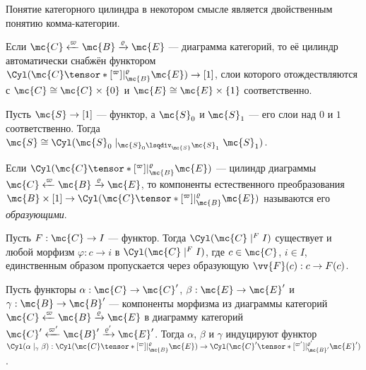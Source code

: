 \documentclass[
	extrafontsizes,
	11pt,
	hyphens,
]{memoir}
\begin{document}
\begin{remark}
Понятие категорного цилиндра в некотором смысле является двойственным понятию комма-категории.
\end{remark}

\begin{observation}
Если \(\mc{C} \xleftarrow{\varpi} \mc{B} \xrightarrow{\varrho} \mc{E}\) --- диаграмма категорий, то её цилиндр автоматически снабжён функтором \(\Cyl(\mc{C} \tensor*[^{\varpi}]{\mid}{^{\varrho}_{\mc{B}}} \mc{E}) \to [1]\), слои которого отождествляются с \(\mc{C} \cong \mc{C} \times \{0\}\) и \(\mc{E} \cong \mc{E} \times \{1\}\) соответственно.
\end{observation}

\begin{observation}
Пусть \(\mc{S} \to [1]\) --- функтор, а \(\mc{S}_0\) и \(\mc{S}_1\) --- его слои над \(0\) и \(1\) соответственно. Тогда
\(\mc{S} \cong \Cyl(\mc{S}_0 \mid_{\mc{S}_0 \lsqdiv_{\mc{S}} \mc{S}_1} \mc{S}_1)\).
\end{observation}

\begin{definition}
Если \(\Cyl(\mc{C} \tensor*[^{\varpi}]{\mid}{^{\varrho}_{\mc{B}}} \mc{E})\) --- цилиндр диаграммы \(\mc{C} \xleftarrow{\varpi} \mc{B} \xrightarrow{\varrho} \mc{E}\),
то компоненты естественного преобразования
\(\mc{B} \times [1] \to \Cyl(\mc{C} \tensor*[^{\varpi}]{\mid}{^{\varrho}_{\mc{B}}} \mc{E})\)
называются его \emph{образующими}.
\end{definition}

\begin{observation}
Пусть \(F : \mc{C} \to I\) --- функтор.
Тогда \(\Cyl(\mc{C} \mid^F I)\) существует и любой морфизм \(\varphi : c \to i\) в \(\Cyl(\mc{C} \mid^F I)\), где \(c \in \mc{C}\), \(i \in I\), единственным образом пропускается через образующую \(\vv{F}(c) : c \to F(c)\).
\end{observation}

\begin{observation}
Пусть функторы
\(\alpha : \mc{C} \to \mc{C}'\),
\(\beta : \mc{E} \to \mc{E}'\) и
\(\gamma : \mc{B} \to \mc{B}'\)
--- компоненты морфизма из диаграммы категорий
\(\mc{C} \xleftarrow{\varpi} \mc{B} \xrightarrow{\varrho} \mc{E}\)
в диаграмму категорий
\(\mc{C}' \xleftarrow{\varpi'} \mc{B}' \xrightarrow{\varrho'} \mc{E}'\).
Тогда \(\alpha\), \(\beta\) и \(\gamma\) индуцируют функтор
\(
\Cyl(\alpha \mid_{\gamma} \beta) :
\Cyl(\mc{C} \tensor*[^{\varpi}]{\mid}{^{\varrho}_{\mc{B}}} \mc{E})
\to
\Cyl(\mc{C}' \tensor*[^{\varpi'}]{\mid}{^{\varrho'}_{\mc{B}'}} \mc{E}')
\).
\end{observation}
\end{document}
